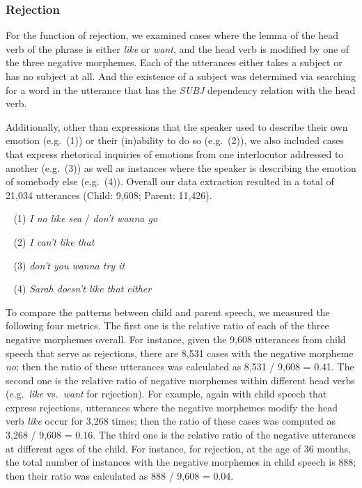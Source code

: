 \documentclass[10pt, letterpaper]{article}
\begin{document}
\hypertarget{rejection}{%
\subsubsection{Rejection}\label{rejection}}

For the function of rejection, we examined cases where the lemma of the
head verb of the phrase is either \emph{like} or \emph{want}, and the
head verb is modified by one of the three negative morphemes. Each of
the utterances either takes a subject or has no subject at all. And the
existence of a subject was determined via searching for a word in the
utterance that has the \emph{SUBJ} dependency relation with the head
verb.

Additionally, other than expressions that the speaker used to describe
their own emotion (e.g.~(1)) or their (in)ability to do so (e.g.~(2)),
we also included cases that express rhetorical inquiries of emotions
from one interlocutor addressed to another (e.g.~(3)) as well as
instances where the speaker is describing the emotion of somebody else
(e.g.~(4)). Overall our data extraction resulted in a total of 21,034
utterances (Child: 9,608; Parent: 11,426).

~ (1) \emph{I no like sea} / \emph{don't wanna go}

~ (2) \emph{I can't like that}

~ (3) \emph{don't you wanna try it}

~ (4) \emph{Sarah doesn't like that either}

To compare the patterns between child and parent speech, we measured the
following four metrics. The first one is the relative ratio of each of
the three negative morphemes overall. For instance, given the 9,608
utterances from child speech that serve as rejections, there are 8,531
cases with the negative morpheme \emph{no}; then the ratio of these
utterances was calculated as 8,531 / 9,608 = 0.41. The second one is the
relative ratio of negative morphemes within different head verbs
(e.g.~\emph{like} vs.~\emph{want} for rejection). For example, again
with child speech that express rejections, utterances where the negative
morphemes modify the head verb \emph{like} occur for 3,268 times; then
the ratio of these cases was computed as 3,268 / 9,608 = 0.16. The third
one is the relative ratio of the negative utterances at different ages
of the child. For instance, for rejection, at the age of 36 months, the
total number of instances with the negative morphemes in child speech is
888; then their ratio was calculated as 888 / 9,608 = 0.04.
\end{document}

